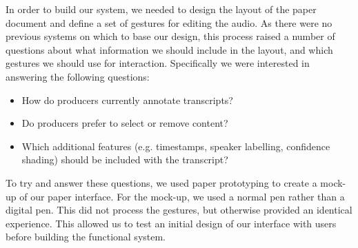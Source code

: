 In order to build our system, we needed to design the layout of the paper document and define a set of gestures for
editing the audio.  As there were no previous systems on which to base our design, this process raised a number of
questions about what information we should include in the layout, and which gestures we should use for interaction.
Specifically we were interested in answering the following questions:

  \begin{itemize}
    \item How do producers currently annotate transcripts?
    \item Do producers prefer to select or remove content?
    \item Which additional features (e.g.  timestamps, speaker labelling, confidence shading) should be included with
          the transcript?
  \end{itemize}

To try and answer these questions, we used paper prototyping to create a mock-up of our paper interface. For the
mock-up, we used a normal pen rather than a digital pen. This did not process the gestures, but otherwise provided an
identical experience.  This allowed us to test an initial design of our interface with users before building the
functional system.




